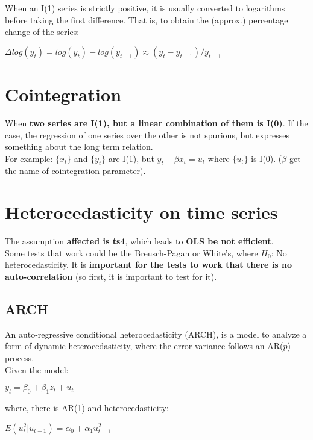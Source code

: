 \documentclass[10pt, a4paper, landscape]{extarticle}
\begin{document}
\begin{multicols}{3}
\begin{multicols}{2}
		\end{multicols}
		When an I(1) series is strictly positive, it is usually converted to logarithms before taking the first difference. That is, to obtain the (approx.) percentage change of the series:
		\begin{center}
			$\Delta log(y_t) = log(y_t) - log(y_{t-1}) \approx (y_t - y_{t-1}) / y_{t-1}$
		\end{center}
\columnbreak
\section*{Cointegration}
	When \textbf{two series are I(1), but a linear combination of them is I(0)}. If the case, the regression of one series over the other is not spurious, but expresses something about the long term relation.
	\\ For example: $\lbrace x_t \rbrace$ and $\lbrace y_t \rbrace$ are I(1), but $y_t - \beta x_t = u_t$ where $\lbrace u_t \rbrace$ is I(0). ($\beta$ get the name of cointegration parameter).

\section*{Heterocedasticity on time series}
	The assumption \textbf{affected is ts4}, which leads to \textbf{OLS be not efficient}. 
	\\ Some tests that work could be the Breusch-Pagan or White's, where $H_0$: No heterocedasticity. It is \textbf{important for the tests to work that there is no auto-correlation} (so first, it is important to test for it).
	\subsection*{ARCH}
		An auto-regressive conditional heterocedasticity (ARCH), is a model to analyze a form of dynamic heterocedasticity, where the error variance follows an AR($p$) process.
		\\ Given the model:
		\begin{center}
			$y_t = \beta_0 + \beta_1 z_t + u_t$
		\end{center}
		where, there is AR(1) and heterocedasticity:
		\begin{center}
			$E(u^2_t | u_{t-1}) = \alpha_0 + \alpha_1 u^2_{t-1}$
		\end{center}

\end{multicols}
\end{document}
